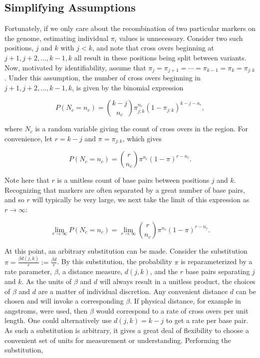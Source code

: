 \documentclass{article}
\begin{document}
\subsection{Simplifying Assumptions} \label{subsec:simplify}

Fortunately, if we only care about the recombination of two particular markers on the genome, estimating individual $\pi_i$ values is unnecessary. Consider two such positions, $j$ and $k$ with $j < k$, and note that cross overs beginning at $j+1, j+2, \dots, k-1, k$ all result in these positions being split between variants. Now, motivated by identifiability, assume that $\pi_j = \pi_{j+1} = \cdots = \pi_{k-1} = \pi_k = \pi_{j:k}$. Under this assumption, the number of cross overs beginning in $j+1,j+2,\dots,k-1,k$, is given by the binomial expression

$$P(N_c = n_c) = {k - j \choose n_c} \pi_{j:k}^{n_c} (1-\pi_{j:k})^{k - j - n_c},$$

\noindent where $N_c$ is a random variable giving the count of cross overs in the region. For convenience, let $r = k - j$ and $\pi = \pi_{j:k}$, which gives

$$P(N_c = n_c) = {r \choose n_c} \pi^{n_c} (1-\pi)^{r - n_c}.$$

\noindent Note here that $r$ is a unitless count of base pairs between positions $j$ and $k$. Recognizing that markers are often separated by a great number of base pairs, and so $r$ will typically be very large, we next take the limit of this expression as $r \rightarrow \infty$:

$$\lim_{r \rightarrow \infty} P(N_c = n_c) = \lim_{r \rightarrow \infty} {r \choose n_c} \pi^{n_c} (1-\pi)^{r - n_c}.$$

\noindent At this point, an arbitrary substitution can be made. Consider the substitution $\pi = \frac{\beta d(j,k)}{r} := \frac{\beta d}{r}$. By this substitution, the probability $\pi$ is reparameterized by a rate parameter, $\beta$, a distance measure, $d(j,k)$, and the $r$ base pairs separating $j$ and $k$. As the units of $\beta$ and $d$ will always result in a unitless product, the choices of $\beta$ and $d$ are a matter of individual discretion. Any convenient distance $d$ can be chosen and will invoke a corresponding $\beta$. If physical distance, for example in angstroms, were used, then $\beta$ would correspond to a rate of cross overs per unit length. One could alternatively use $d(j,k)=k-j$ to get a rate per base pair. As such a substitution is arbitrary, it gives a great deal of flexibility to choose a convenient set of units for measurement or understanding. Performing the substitution,
\end{document}
